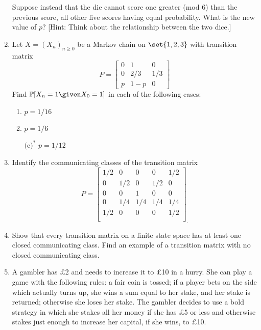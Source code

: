 \documentclass[a4paper,12pt]{article}
\begin{document}
\begin{enumerate}[label=\arabic*.,leftmargin=*]
  Suppose instead that the die cannot score one greater (mod \(6\)) than the
  previous score, all other five scores having equal probability. What is the
  new value of \(p\)? [Hint: Think about the relationship between the two dice.]
 \item
  Let \(X = (X_n)_{n \ge 0}\) be a Markov chain on \(\set{1, 2, 3}\) with
  transition matrix
  \begin{equation*}
   P =
   \begin{bmatrix}
    0 & 1 & 0 \\
    0 & 2/3 & 1/3 \\
    p & 1 - p & 0
   \end{bmatrix}
  \end{equation*}
  Find \(\Prob{X_n = 1 \given X_0 = 1}\) in each of the following cases:
  \begin{multicols}{3}
   \begin{enumerate}[label=(\alph*)]
    \item
     \(p = 1/16\)
    \item
     \(p = 1/6\)
    \item[\(\text{(c)}^\ast\)]
     \(p = 1/12\)
   \end{enumerate}
  \end{multicols}
 \item
  Identify the communicating classes of the transition matrix
  \begin{equation*}
   P =
   \begin{bmatrix}
    1/2 & 0 & 0 & 0 & 1/2 \\
    0 & 1/2 & 0 & 1/2 & 0 \\
    0 & 0 & 1 & 0 & 0 \\
    0 & 1/4 & 1/4 & 1/4 & 1/4 \\
    1/2 & 0 & 0 & 0 & 1/2 \\
   \end{bmatrix}_.
  \end{equation*}
 \item
  Show that every transition matrix on a finite state space has at least one
  closed communicating class. Find an example of a transition matrix with no
  closed communicating class.
 \item
  A gambler has £2 and needs to increase it to £10 in a hurry. She can play a
  game with the following rules: a fair coin is tossed; if a player bets on the
  side which actually turns up, she wins a sum equal to her stake, and her stake
  is returned; otherwise she loses her stake. The gambler decides to use a bold
  strategy in which she stakes all her money if she has £5 or less and otherwise
  stakes just enough to increase her capital, if she wins, to £10.


\end{enumerate}
\end{document}

